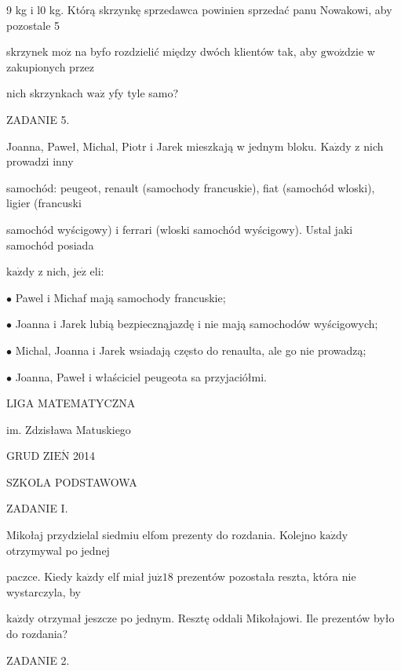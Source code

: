 \documentclass[a4paper,12pt]{article}
\begin{document}
9 kg i l0 kg. Którą skrzynkę sprzedawca powinien sprzedać panu Nowakowi, aby pozostale 5

skrzynek $\mathrm{m}\mathrm{o}\dot{\mathrm{z}}$ na byfo rozdzielić między dwóch klientów tak, aby $\mathrm{g}\mathrm{w}\mathrm{o}\acute{\mathrm{z}}$dzie w zakupionych przez

nich skrzynkach $\mathrm{w}\mathrm{a}\dot{\mathrm{z}}$ yfy tyle samo?

ZADANIE 5.

Joanna, Paweł, Michal, Piotr i Jarek mieszkają w jednym bloku. $\mathrm{K}\mathrm{a}\dot{\mathrm{z}}\mathrm{d}\mathrm{y}$ z nich prowadzi inny

samochód: peugeot, renault (samochody francuskie), fiat (samochód wloski), ligier (francuski

samochód wyścigowy) i ferrari (wloski samochód wyścigowy). Ustal jaki samochód posiada

$\mathrm{k}\mathrm{a}\dot{\mathrm{z}}\mathrm{d}\mathrm{y}$ z nich, $\mathrm{j}\mathrm{e}\dot{\mathrm{z}}$ eli:

$\bullet$ Pawel i Michaf mają samochody francuskie;

$\bullet$ Joanna i Jarek lubią bezpiecznąjazdę i nie mają samochodów wyścigowych;

$\bullet$ Michal, Joanna i Jarek wsiadają często do renaulta, ale go nie prowadzą;

$\bullet$ Joanna, Paweł i właściciel peugeota sa przyjaciółmi.






LIGA MATEMATYCZNA

im. Zdzisława Matuskiego

GRUD Z$\mathrm{I}\mathrm{E}\acute{\mathrm{N}}$ 2014

SZKOLA PODSTAWOWA

ZADANIE I.

Mikołaj przydzielal siedmiu elfom prezenty do rozdania. Kolejno $\mathrm{k}\mathrm{a}\dot{\mathrm{z}}\mathrm{d}\mathrm{y}$ otrzymywal po jednej

paczce. Kiedy $\mathrm{k}\mathrm{a}\dot{\mathrm{z}}\mathrm{d}\mathrm{y}$ elf miał $\mathrm{j}\mathrm{u}\dot{\mathrm{z}} 18$ prezentów pozostała reszta, która nie wystarczyla, by

$\mathrm{k}\mathrm{a}\dot{\mathrm{z}}\mathrm{d}\mathrm{y}$ otrzymał jeszcze po jednym. Resztę oddali Mikołajowi. Ile prezentów było do rozdania?

ZADANIE 2.
\end{document}
